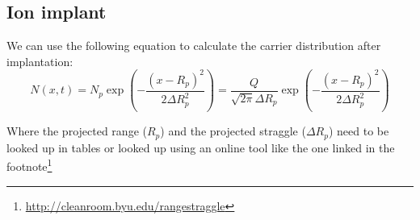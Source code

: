\subsection{Ion implant}
We can use the following equation to calculate the carrier distribution after implantation:
\begin{equation}
N(x,t)
=
N_p \exp\left(-\frac{(x-R_p)^2}{2\Delta R_p^2}\right)
=
\frac{Q}{\sqrt{2\pi}\Delta R_p}\exp\left(-\frac{(x-R_p)^2}{2\Delta R_p^2}\right)
\end{equation}

Where the projected range ($R_p$) and the projected straggle ($\Delta R_p$) need to be looked up in tables or looked up using an online tool like the one linked in the footnote\footnote{\url{http://cleanroom.byu.edu/rangestraggle}}